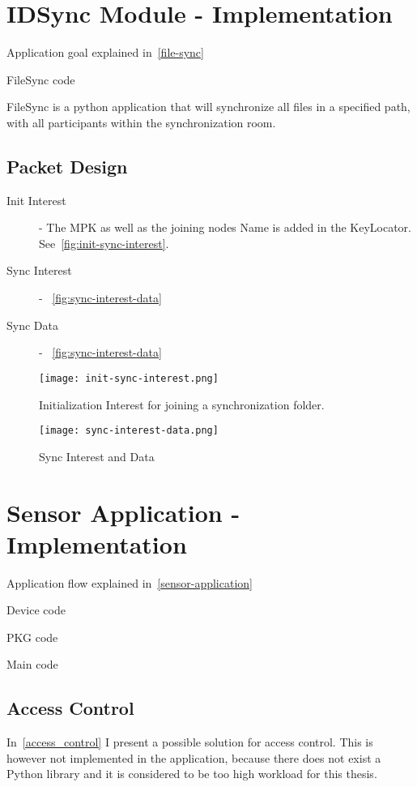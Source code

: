 \section{IDSync Module - Implementation}
Application goal explained in~\autoref{file-sync}

FileSync code~\cite[fileSync.py]{garseg15}

FileSync is a python application that will synchronize all files in a specified path, with all participants within the synchronization room.

\subsection{Packet Design}

\begin{description}
  \item[Init Interest] - 
  The \gls{MPK} as well as the joining nodes Name is added in the KeyLocator. See~\autoref{fig:init-sync-interest}.
  \item[Sync Interest] -
  ~\autoref{fig:sync-interest-data}
  \item[Sync Data] - 
  ~\autoref{fig:sync-interest-data}
\end{description}

\begin{figure}[ht]
  \centering
  \texttt{[image: init-sync-interest.png]}
  \caption{Initialization Interest for joining a synchronization folder.}
  \label{fig:init-sync-interest}
\end{figure}

\begin{figure}[ht]
  \centering
  \texttt{[image: sync-interest-data.png]}
  \caption{Sync Interest and Data}
  \label{fig:sync-interest-data}
\end{figure}


\section{Sensor Application - Implementation}
Application flow explained in~\autoref{sensor-application}

Device code~\cite[device.py]{garseg15}

\gls{PKG} code~\cite[publicKeyGenerator.py]{garseg15}

Main code~\cite[application.py]{garseg15}

\subsection{Access Control}
In~\autoref{access_control} I present a possible solution for access control.
This is however not implemented in the application, because there does not exist a Python library and it is considered to be too high workload for this thesis.

